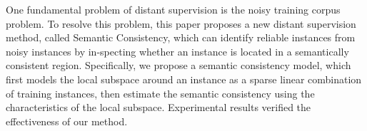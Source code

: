 One fundamental problem of distant supervision is the noisy training corpus problem. To resolve this problem, this paper proposes a new distant supervision method, called Semantic Consistency, which can identify reliable instances from noisy instances by in-specting whether an instance is located in a semantically consistent region. Specifically, we propose a semantic consistency model, which first models the local subspace around an instance as a sparse linear combination of training instances, then estimate the semantic consistency using the characteristics of the local subspace. Experimental results verified the effectiveness of our method.
